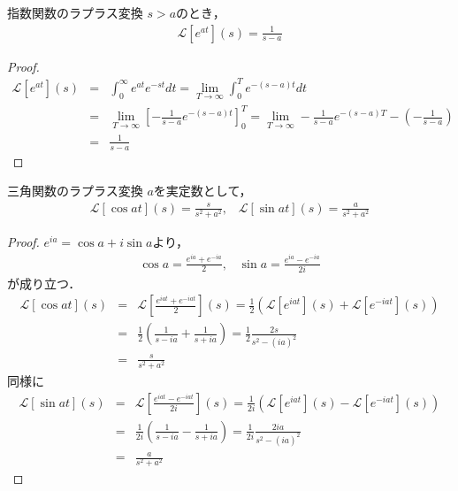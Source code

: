 \begin{exprbox}{指数関数のラプラス変換}
    $s > a$のとき，
    \begin{eqnarray}
        \mathcal{L}[e^{at}](s) = \frac{1}{s - a}
    \end{eqnarray}
    \begin{proof}
        \begin{eqnarray*}
            \mathcal{L}[e^{at}](s) &=& \int_{0}^{\infty} e^{at} e^{-st} dt
            = \lim_{T \to \infty} \int_{0}^{T} e^{-(s - a)t} dt \\
            &=& \lim_{T \to \infty} \left[-\frac{1}{s - a}e^{-(s - a)t}\right]_0^T 
            = \lim_{T \to \infty} -\frac{1}{s - a}e^{-(s - a)T} - \left(-\frac{1}{s - a}\right) \\
            &=& \frac{1}{s - a}
        \end{eqnarray*}
    \end{proof}
\end{exprbox}

\begin{exprbox}{三角関数のラプラス変換}
    $a$を実定数として，
    \begin{eqnarray}
        \mathcal{L}[\cos at](s) = \frac{s}{s^2 + a^2},\hspace{10pt}\mathcal{L}[\sin at](s) = \frac{a}{s^2 + a^2}
    \end{eqnarray}
    \begin{proof}
        $e^{ia} = \cos a + i\sin a$より，
        \begin{eqnarray}
            \cos a = \frac{e^{ia} + e^{-ia}}{2},\hspace{10pt}\sin a = \frac{e^{ia} - e^{-ia}}{2i}
        \end{eqnarray}
        が成り立つ．
        \begin{eqnarray*}
            \mathcal{L}[\cos at](s) &=& \mathcal{L}[\frac{e^{iat} + e^{-iat}}{2}](s)
            = \frac{1}{2}\left(\mathcal{L}[e^{iat}](s) + \mathcal{L}[e^{-iat}](s)\right)\\
            &=& \frac{1}{2} \left(\frac{1}{s - ia} + \frac{1}{s + ia}\right)
            = \frac{1}{2} \frac{2s}{s^2 - (ia)^2} \\
            &=& \frac{s}{s^2 + a^2}
        \end{eqnarray*}
        同様に
        \begin{eqnarray*}
            \mathcal{L}[\sin at](s) &=& \mathcal{L}[\frac{e^{iat} - e^{-iat}}{2i}](s)
            = \frac{1}{2i}\left(\mathcal{L}[e^{iat}](s) - \mathcal{L}[e^{-iat}](s)\right)\\
            &=& \frac{1}{2i} \left(\frac{1}{s - ia} - \frac{1}{s + ia}\right)
            = \frac{1}{2i} \frac{2ia}{s^2 - (ia)^2} \\
            &=& \frac{a}{s^2 + a^2}
        \end{eqnarray*}
    \end{proof}
\end{exprbox}

